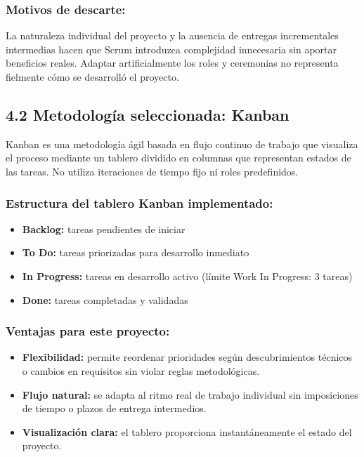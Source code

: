 \subsubsection{Motivos de descarte:}

La naturaleza individual del proyecto y la ausencia de entregas incrementales intermedias hacen que Scrum introduzca complejidad innecesaria sin aportar beneficios reales. Adaptar artificialmente los roles y ceremonias no representa fielmente cómo se desarrolló el proyecto.

\subsection{4.2 Metodología seleccionada: Kanban}

Kanban es una metodología ágil basada en flujo continuo de trabajo que visualiza el proceso mediante un tablero dividido en columnas que representan estados de las tareas. No utiliza iteraciones de tiempo fijo ni roles predefinidos.

\subsubsection{Estructura del tablero Kanban implementado:}

\begin{itemize}
    \item \textbf{Backlog:} tareas pendientes de iniciar
    \item \textbf{To Do:} tareas priorizadas para desarrollo inmediato
    \item \textbf{In Progress:} tareas en desarrollo activo (límite Work In Progress: 3 tareas)
    \item \textbf{Done:} tareas completadas y validadas
\end{itemize}

\subsubsection{Ventajas para este proyecto:}

\begin{itemize}
    \item \textbf{Flexibilidad:} permite reordenar prioridades según descubrimientos técnicos o cambios en requisitos sin violar reglas metodológicas.
    \item \textbf{Flujo natural:} se adapta al ritmo real de trabajo individual sin imposiciones de tiempo o plazos de entrega intermedios.
    \item \textbf{Visualización clara:} el tablero proporciona instantáneamente el estado del proyecto.
\end{itemize}

